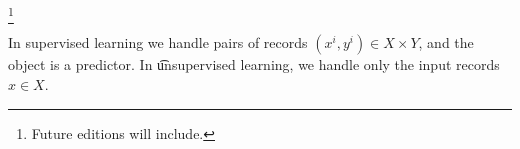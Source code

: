 
  \ifhmode\unskip\fi\footnote{
Future editions will include.
  }

In supervised learning we handle pairs of records $(x^i, y^i) \in X \times Y$, and the object is a predictor.
In \t{unsupervised learning}, we handle only the input records $x \in X$.

\blankpage

